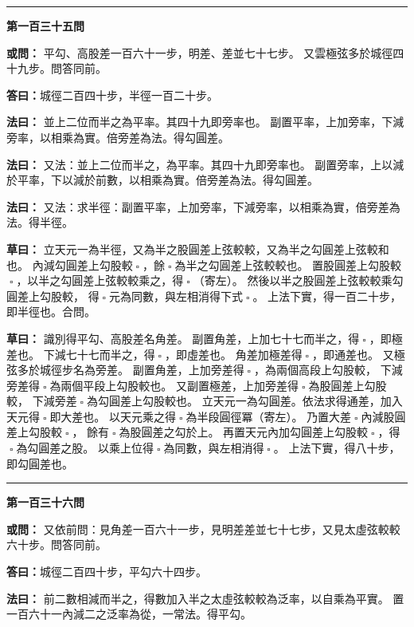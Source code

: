 \documentclass[11pt,a4paper]{article}
\let\origsquare\square
\renewcommand{\square}{\ensuremath{\origsquare}}%
\newcommand{\longline}{\noindent\rule{\textwidth}{0.4pt}}
\newcommand{\owen}[1]{%
  \par\vspace{0.4em}%
  \noindent\textcolor{problemcolor}{\textbf{或問：}}{\tradfont #1}\par\nopagebreak%
}
\newcommand{\fayue}[1]{%
  \par\noindent\textcolor{methodcolor}{\textbf{法曰：}}{\tradfont #1}\par\nopagebreak%
}
\newcommand{\tsaoyue}[1]{%
  \par\noindent\textcolor{workcolor}{\textbf{草曰：}}{\tradfont #1}\par%
}
\newcommand{\dayue}[1]{%
  \par\noindent\textcolor{anscolor}{\textbf{答曰：}}{\tradfont #1}\par\nopagebreak%
}
\newcommand{\wen}[1]{\par\vspace{0.3em}\noindent\textcolor{problemcolor}{\textbf{第#1問}}\par}
\begin{document}
\vspace{0.5cm}
\begin{center}
\longline
\end{center}

\wen{一百三十五}
\owen{%
平勾、高股差一百六十一步，明差、差並七十七步。
又雲極弦多於城徑四十九步。問答同前。}
\dayue{城徑二百四十步，半徑一百二十步。}

\fayue{%
並上二位而半之為平率。其四十九即旁率也。
副置平率，上加旁率，下減旁率，以相乘為實。倍旁差為法。得勾圓差。}

\fayue{%
又法：並上二位而半之，為平率。其四十九即旁率也。
副置旁率，上以減於平率，下以減於前數，以相乘為實。倍旁差為法。得勾圓差。}

\fayue{%
又法：求半徑：副置平率，上加旁率，下減旁率，以相乘為實，倍旁差為法。得半徑。}

\tsaoyue{%
立天元一為半徑，又為半之股圓差上弦較較，又為半之勾圓差上弦較和也。
內減勾圓差上勾股較$ \; \square \; $，餘$ \; \square \; $為半之勾圓差上弦較較也。
置股圓差上勾股較$ \; \square \; $，以半之勾圓差上弦較較乘之，得$ \; \square \; $（寄左）。
然後以半之股圓差上弦較較乘勾圓差上勾股較，
得$ \; \square \; $元為同數，與左相消得下式$ \; \square \; $。
上法下實，得一百二十步，即半徑也。合問。}

\tsaoyue{%
識別得平勾、高股差名角差。
副置角差，上加七十七而半之，得$ \; \square \; $，即極差也。
下減七十七而半之，得$ \; \square \; $，即虛差也。
角差加極差得$ \; \square \; $，即通差也。
又極弦多於城徑步名為旁差。
副置角差，上加旁差得$ \; \square \; $，為兩個高段上勾股較，
下減旁差得$ \; \square \; $為兩個平段上勾股較也。
又副置極差，上加旁差得$ \; \square \; $為股圓差上勾股較，
下減旁差$ \; \square \; $為勾圓差上勾股較也。
立天元一為勾圓差。依法求得通差，加入天元得$ \; \square \; $即大差也。
以天元乘之得$ \; \square \; $為半段圓徑冪（寄左）。
乃置大差$ \; \square \; $內減股圓差上勾股較$ \; \square \; $，
餘有$ \; \square \; $為股圓差之勾於上。
再置天元內加勾圓差上勾股較$ \; \square \; $，得$ \; \square \; $為勾圓差之股。
以乘上位得$ \; \square \; $為同數，與左相消得$ \; \square \; $。
上法下實，得八十步，即勾圓差也。}

\vspace{0.5cm}
\begin{center}
\longline
\end{center}

\wen{一百三十六}
\owen{%
又依前問：見角差一百六十一步，見明差差並七十七步，又見太虛弦較較六十步。問答同前。}
\dayue{城徑二百四十步，平勾六十四步。}

\fayue{%
前二數相減而半之，得數加入半之太虛弦較較為泛率，以自乘為平實。
置一百六十一內減二之泛率為從，一常法。得平勾。}
\end{document}
